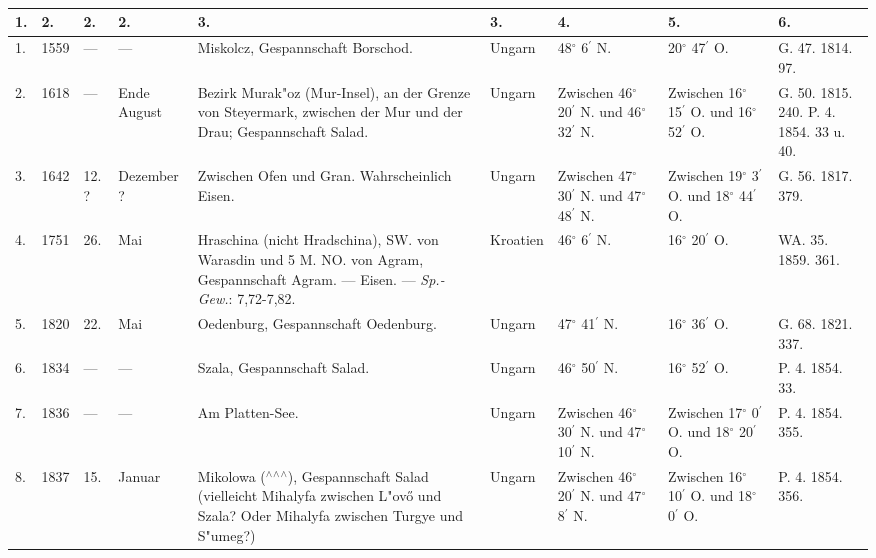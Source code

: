 \documentclass[a4paper, 8pt, oneside, polutonikogreek, german]{article}
\begin{document}
\subsubsection{}
\begin{center}
    \footnotesize
    \begin{longtable}{|p{3mm}|p{5mm}|p{5mm}|p{13mm}|p{25mm}|p{16mm}|p{10mm}|p{10mm}|p{11mm}|}
    \hline
        1. & 2. & 2. & 2. & 3. & 3. & 4. & 5. & 6. \\ \hline
        1. & 1559 & --- & --- & Miskolcz, Gespannschaft Borschod. & Ungarn & 48$^\circ$ 6$^\prime$ N. & 20$^\circ$ 47$^\prime$ O. & G. 47. 1814. 97. \\ \hline
        2. & 1618 & --- & Ende August & Bezirk Murak"oz (Mur-Insel), an der Grenze von Steyermark, zwischen der Mur und der Drau; Gespannschaft Salad. & Ungarn & Zwischen 46$^\circ$ 20$^\prime$ N. und 46$^\circ$ 32$^\prime$ N. & Zwischen 16$^\circ$ 15$^\prime$ O. und 16$^\circ$ 52$^\prime$ O. & G. 50. 1815. 240. P. 4. 1854. 33 u. 40. \\ \hline
        3. & 1642 & 12. ? & Dezember ? & Zwischen Ofen und Gran. Wahrscheinlich Eisen. & Ungarn & Zwischen 47$^\circ$ 30$^\prime$ N. und 47$^\circ$ 48$^\prime$ N. & Zwischen 19$^\circ$ 3$^\prime$ O. und 18$^\circ$ 44$^\prime$ O. & G. 56. 1817. 379. \\ \hline
        4. & 1751 & 26. & Mai & Hraschina (nicht Hradschina), SW. von Warasdin und 5 M. NO. von Agram, Gespannschaft Agram. --- Eisen. --- \emph{Sp.-Gew.}: 7,72-7,82. & Kroatien & 46$^\circ$ 6$^\prime$ N. & 16$^\circ$ 20$^\prime$ O. & WA. 35. 1859. 361. \\ \hline
        5. & 1820 & 22. & Mai & Oedenburg, Gespannschaft Oedenburg. & Ungarn & 47$^\circ$ 41$^\prime$ N. & 16$^\circ$ 36$^\prime$ O. & G. 68. 1821. 337. \\ \hline
        6. & 1834 & --- & --- & Szala, Gespannschaft Salad. & Ungarn & 46$^\circ$ 50$^\prime$ N. & 16$^\circ$ 52$^\prime$ O. & P. 4. 1854. 33. \\ \hline
        7. & 1836 & --- & --- & Am Platten-See. & Ungarn & Zwischen 46$^\circ$ 30$^\prime$ N. und 47$^\circ$ 10$^\prime$ N. & Zwischen 17$^\circ$ 0$^\prime$ O. und 18$^\circ$ 20$^\prime$ O. & P. 4. 1854. 355. \\ \hline
        8. & 1837 & 15. & Januar & Mikolowa ($^\wedge$$^\wedge$$^\wedge$), Gespannschaft Salad (vielleicht Mihalyfa zwischen L"ovő und Szala? Oder Mihalyfa zwischen Turgye und S"umeg?) & Ungarn & Zwischen 46$^\circ$ 20$^\prime$ N. und 47$^\circ$ 8$^\prime$ N. & Zwischen 16$^\circ$ 10$^\prime$ O. und 18$^\circ$ 0$^\prime$ O. & P. 4. 1854. 356. \\ \hline

\end{longtable}
\end{center}
\end{document}
